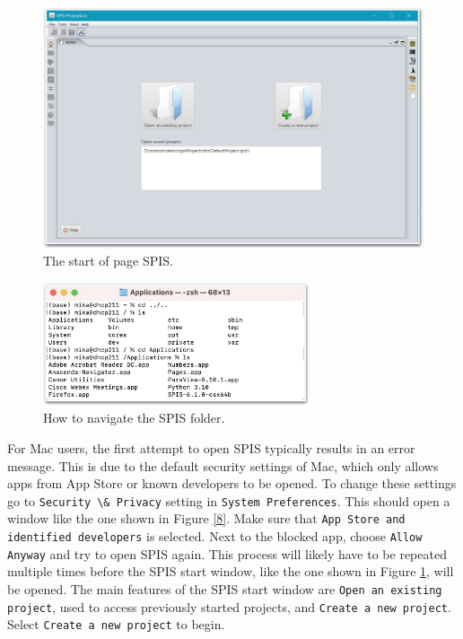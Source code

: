 \documentclass[a4paper, 12pt]{article}
\begin{document}
\begin{figure}[!ht]
    \centering
    \includegraphics[width=1\textwidth]{fig6.jpg}
    \caption{The start of page SPIS.}
    \label{6}
\end{figure}

\begin{figure}[!ht]
    \centering
    \includegraphics[width=0.7\textwidth]{fig7.jpg}
    \caption{How to navigate the SPIS folder.}
    \label{7}
\end{figure}

For Mac users, the first attempt to open SPIS typically results in an error message. This is due to the default security settings of Mac, which only allows apps from App Store or known developers to be opened. To change these settings go to \verb|Security \& Privacy| setting in \verb|System Preferences|. This should open a window like the one shown in Figure \ref{8}. Make sure that \verb|App Store and identified developers| is selected. Next to the blocked app, choose \verb|Allow Anyway| and try to open SPIS again. This process will likely have to be repeated multiple times before the SPIS start window, like the one shown in Figure \ref{6}, will be opened. The main features of the SPIS start window are \verb|Open an existing project|, used to access previously started projects, and \verb|Create a new project|. Select \verb|Create a new project| to begin.\\
\end{document}
